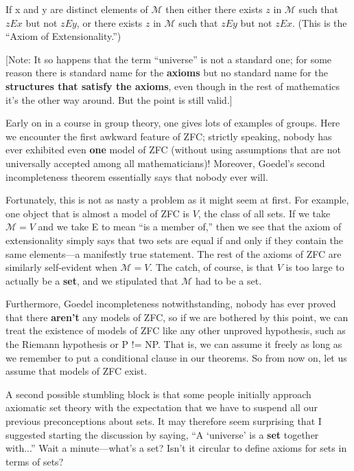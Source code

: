 \documentclass[10pt]{article}
\newcommand\axiom[1]{\textmd{#1}}
\begin{document}
 If x and y are distinct elements of $\mathcal{M}$ then either there
 exists $z$ in $\mathcal{M}$ such that $z E x$ but not $z E y$, or there
 exists $z$ in $\mathcal{M}$ such that $z E y$ but not $z E x$. (This is
 the ``Axiom of Extensionality.'')

[Note: It so happens that the term ``universe'' is not a standard one; for some reason there is standard name for the \textbf{axioms} but no standard name for the \textbf{structures that satisfy the axioms}, even though in the rest of mathematics it's the other way around. But the point is still valid.]

Early on in a course in group theory, one gives lots of examples of groups. Here we encounter the first awkward feature of \axiom{ZFC}; strictly speaking, nobody has ever exhibited even \textbf{one} model of \axiom{ZFC} (without using assumptions that are not universally accepted among all mathematicians)! Moreover, Goedel's second incompleteness theorem essentially says that nobody ever will.

Fortunately, this is not as nasty a problem as it might seem at first. For example, one object that is almost a model of \axiom{ZFC} is $V$, the class of all sets. If we take $\mathcal{M} = V$ and we take E to mean ``is a member of,'' then we see that the axiom of extensionality simply says that two sets are equal if and only if they contain the same elements---a manifestly true statement. The rest of the axioms of \axiom{ZFC} are similarly self-evident when $\mathcal{M} = V$. The catch, of course, is that $V$ is too large to actually be a \textbf{set}, and we stipulated that $\mathcal{M}$ had to be a set.

Furthermore, Goedel incompleteness notwithstanding, nobody has ever proved that there \textbf{aren't} any models of \axiom{ZFC}, so if we are bothered by this point, we can treat the existence of models of \axiom{ZFC} like any other unproved hypothesis, such as the Riemann hypothesis or P != NP. That is, we can assume it freely as long as we remember to put a conditional clause in our theorems. So from now on, let us assume that models of \axiom{ZFC} exist.

A second possible stumbling block is that some people initially approach axiomatic set theory with the expectation that we have to suspend all our previous preconceptions about sets. It may therefore seem surprising that I suggested starting the discussion by saying, ``A `universe' is a \textbf{set} together with...'' Wait a minute---what's a set? Isn't it circular to define axioms for sets in terms of sets?
\end{document}
